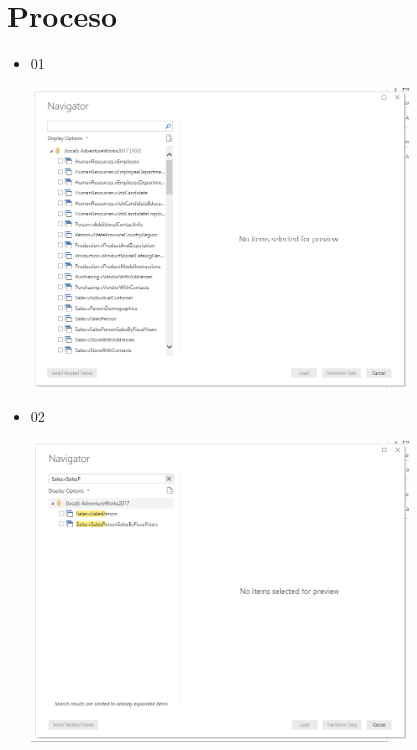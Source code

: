 \section{Proceso} 

\begin{itemize}
	\item 01
	\begin{center}
	\includegraphics[width=10cm]{./Imagenes/1} 
	\end{center}
\end{itemize} 

\begin{itemize}
	\item 02
	\begin{center}
	\includegraphics[width=10cm]{./Imagenes/2} 
	\end{center}
\end{itemize} 

